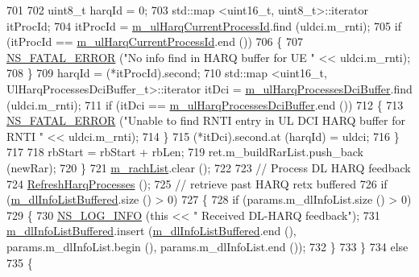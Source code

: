 \begin{DoxyCode}
701 
702           uint8\_t harqId = 0;
703           std::map <uint16\_t, uint8\_t>::iterator itProcId;
704           itProcId = \hyperlink{classns3_1_1RrFfMacScheduler_ad7674f8cb560202bc36a792f7b2755ca}{m\_ulHarqCurrentProcessId}.find (uldci.m\_rnti);
705           \textcolor{keywordflow}{if} (itProcId == \hyperlink{classns3_1_1RrFfMacScheduler_ad7674f8cb560202bc36a792f7b2755ca}{m\_ulHarqCurrentProcessId}.end ())
706             \{
707               \hyperlink{group__fatal_ga5131d5e3f75d7d4cbfd706ac456fdc85}{NS\_FATAL\_ERROR} (\textcolor{stringliteral}{"No info find in HARQ buffer for UE "} << uldci.m\_rnti);
708             \}
709           harqId = (*itProcId).second;
710           std::map <uint16\_t, UlHarqProcessesDciBuffer\_t>::iterator itDci = 
      \hyperlink{classns3_1_1RrFfMacScheduler_a530849c4c8d3d5b0796e6af3d8d95173}{m\_ulHarqProcessesDciBuffer}.find (uldci.m\_rnti);
711           \textcolor{keywordflow}{if} (itDci == \hyperlink{classns3_1_1RrFfMacScheduler_a530849c4c8d3d5b0796e6af3d8d95173}{m\_ulHarqProcessesDciBuffer}.end ())
712             \{
713               \hyperlink{group__fatal_ga5131d5e3f75d7d4cbfd706ac456fdc85}{NS\_FATAL\_ERROR} (\textcolor{stringliteral}{"Unable to find RNTI entry in UL DCI HARQ buffer for RNTI "} << 
      uldci.m\_rnti);
714             \}
715           (*itDci).second.at (harqId) = uldci;
716         \}
717 
718       rbStart = rbStart + rbLen;
719       ret.m\_buildRarList.push\_back (newRar);
720     \}
721   \hyperlink{classns3_1_1RrFfMacScheduler_a471cdca79a50c90f7c871c15d02755fc}{m\_rachList}.clear ();
722 
723   \textcolor{comment}{// Process DL HARQ feedback}
724   \hyperlink{classns3_1_1RrFfMacScheduler_a8489330ad94640e0d432db6f11156d43}{RefreshHarqProcesses} ();
725   \textcolor{comment}{// retrieve past HARQ retx buffered}
726   \textcolor{keywordflow}{if} (\hyperlink{classns3_1_1RrFfMacScheduler_a4176ffb0eba681a3e3b5be0be1a30771}{m\_dlInfoListBuffered}.size () > 0)
727     \{
728       \textcolor{keywordflow}{if} (params.m\_dlInfoList.size () > 0)
729         \{
730           \hyperlink{group__logging_gafbd73ee2cf9f26b319f49086d8e860fb}{NS\_LOG\_INFO} (\textcolor{keyword}{this} << \textcolor{stringliteral}{" Received DL-HARQ feedback"});
731           \hyperlink{classns3_1_1RrFfMacScheduler_a4176ffb0eba681a3e3b5be0be1a30771}{m\_dlInfoListBuffered}.insert (\hyperlink{classns3_1_1RrFfMacScheduler_a4176ffb0eba681a3e3b5be0be1a30771}{m\_dlInfoListBuffered}.end (),
       params.m\_dlInfoList.begin (), params.m\_dlInfoList.end ());
732         \}
733     \}
734   \textcolor{keywordflow}{else}
735     \{

\end{DoxyCode}
